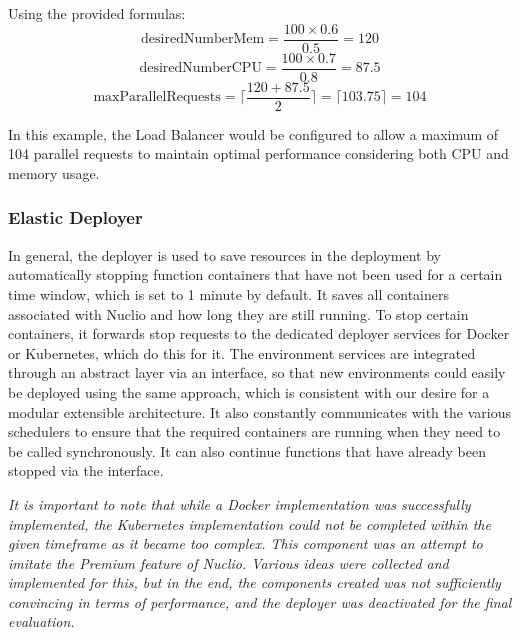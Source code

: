Using the provided formulas:
\[
\text{{desiredNumberMem}} = \dfrac{100 \times 0.6}{0.5} = 120
\]
\[
\text{{desiredNumberCPU}} = \dfrac{100 \times 0.7}{0.8} = 87.5
\]
\[
\text{{maxParallelRequests}} = \lceil \frac{120 + 87.5}{2} \rceil = \lceil 103.75 \rceil = 104
\]

In this example, the Load Balancer would be configured to allow a maximum of 104 parallel requests to maintain optimal performance considering both CPU and memory usage.

\subsubsection{Elastic Deployer}
\label{sec:elastic-deploy}
In general, the deployer is used to save resources in the deployment by automatically stopping function containers that have not been used for a certain time window, which is set to 1 minute by default. It saves all containers associated with Nuclio and how long they are still running.
To stop certain containers, it forwards stop requests to the dedicated deployer services for Docker or Kubernetes, which do this for it. The environment services are integrated through an abstract layer via an interface, so that new environments could easily be deployed using the same approach, which is consistent with our desire for a modular extensible architecture.
It also constantly communicates with the various schedulers to ensure that the required containers are running when they need to be called synchronously. It can also continue functions that have already been stopped via the interface.

\textit{It is important to note that while a Docker implementation was successfully implemented, the Kubernetes implementation could not be completed within the given timeframe as it became too complex. This component was an attempt to imitate the Premium feature of Nuclio. Various ideas were collected and implemented for this, but in the end, the components created was not sufficiently convincing in terms of performance, and the deployer was deactivated for the final evaluation.} 

